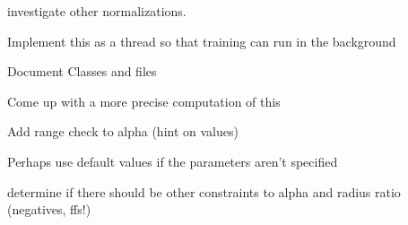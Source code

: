 \begin{DoxyRefList}
investigate other normalizations.  
\item[\label{todo__todo000014}%
\hypertarget{todo__todo000014}{}%
\-Class \hyperlink{classhsom_1_1_h_s_o_m}{hsom\-:\-:\-H\-S\-O\-M} ]\-Implement this as a thread so that training can run in the background  
\item[\label{todo__todo000015}%
\hypertarget{todo__todo000015}{}%
\-Class \hyperlink{classhsom_1_1_normalizer}{hsom\-:\-:\-Normalizer} ]\-Document \-Classes and files  
\item[\label{todo__todo000009}%
\hypertarget{todo__todo000009}{}%
\-Member \hyperlink{classhsom_1_1_quad_grid_a8f5bc5583e2d254f3850dfa0542a5505}{hsom\-:\-:\-Quad\-Grid$<$ \-T $>$\-:\-:diagonal} ()]\-Come up with a more precise computation of this  
\item[\label{todo__todo000016}%
\hypertarget{todo__todo000016}{}%
\-Member \hyperlink{classhsom_1_1_s_o_m_ab49f133b064128ddce266f806ece2229}{hsom\-:\-:\-S\-O\-M\-:\-:initialize\-Training} (\-Q\-Map$<$ Q\-String, Q\-Variant $>$ som\-Parameters, \-Normalizer\-Ptr normalizer, int feature\-Size)]\-Add range check to alpha (hint on values) 

\-Perhaps use default values if the parameters aren't specified 

determine if there should be other constraints to alpha and radius ratio (negatives, ffs!) 
\end{DoxyRefList}